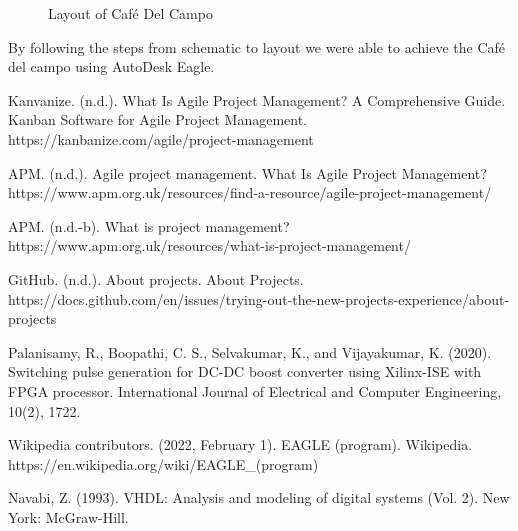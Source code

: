 \documentclass[12pt]{article}
\begin{document}
\begin{figure}[H]
\caption{Layout of Café Del Campo}
\label{fig:eagle6}
\end{figure}

By following the steps from schematic to layout we were able to achieve the Café del campo using AutoDesk Eagle.


\newpage

\begin{thebibliography}{9}
Kanvanize. (n.d.). What Is Agile Project Management? A Comprehensive Guide. Kanban Software for Agile Project Management. https://kanbanize.com/agile/project-management

APM. (n.d.). Agile project management. What Is Agile Project Management? https://www.apm.org.uk/resources/find-a-resource/agile-project-management/

APM. (n.d.-b). What is project management? https://www.apm.org.uk/resources/what-is-project-management/

GitHub. (n.d.). About projects. About Projects. https://docs.github.com/en/issues/trying-out-the-new-projects-experience/about-projects

Palanisamy, R., Boopathi, C. S., Selvakumar, K., and Vijayakumar, K. (2020). Switching pulse generation for DC-DC boost converter using Xilinx-ISE with FPGA processor. International Journal of Electrical and Computer Engineering, 10(2), 1722.

Wikipedia contributors. (2022, February 1). EAGLE (program). Wikipedia. https://en.wikipedia.org/wiki/EAGLE\_(program)

Navabi, Z. (1993). VHDL: Analysis and modeling of digital systems (Vol. 2). New York: McGraw-Hill.

\end{thebibliography}
\end{document}
